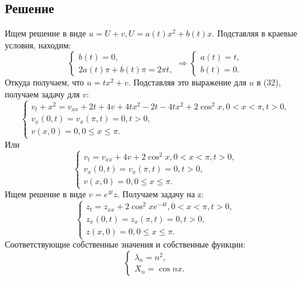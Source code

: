 \documentclass[11pt]{article}
\begin{document}
\subsection{Решение}
\label{sec:orgcfd2f09}
Ищем решение в виде $u = U + v, U = a(t)x^2 + b(t)x$. Подставляя в краевые условия, находим:
\begin{equation*}
\begin{cases}
b(t) = 0, \\
2a(t)\pi + b(t)\pi = 2\pi t,
\end{cases}
\Rightarrow
\begin{cases}
a(t) = t, \\
b(t) = 0.
\end{cases}
\end{equation*}
Откуда получаем, что $u = tx^2 + v$. Подставляя это выражение для $u$ в (32), получаем задачу
для $v$:
\begin{equation*}
\begin{cases}
v_t + x^2 = v_{xx} + 2t + 4v + 4tx^2 - 2t - 4tx^2 + 2\cos^2x, 0 < x < \pi, t > 0, \\
v_x(0, t) = v_x(\pi, t) = 0, t > 0, \\
v(x, 0) = 0, 0 \leq x \leq \pi.
\end{cases}
\end{equation*}
Или
\begin{equation}
\begin{cases}
v_t = v_{xx} + 4v + 2\cos^2x, 0 < x < \pi, t > 0, \\
v_x(0, t) = v_x(\pi, t) = 0, t > 0, \\
v(x, 0) = 0, 0 \leq x \leq \pi.
\end{cases}
\end{equation}
Ищем решение в виде $v = e^{4t}z$. Получаем задачу на z:
\begin{equation}
\begin{cases}
z_t = z_{xx} + 2\cos^2xe^{-4t}, 0 < x < \pi, t > 0, \\
z_x(0, t) = z_x(\pi, t) = 0, t > 0, \\
z(x, 0) = 0, 0 \leq x \leq \pi.
\end{cases}
\end{equation}
Соответствующие собственные значения и собственные функции:
\begin{equation*}
\begin{cases}
\lambda_n = n^2, \\
X_n = \cos nx.
\end{cases}
\end{equation*}
\end{document}
